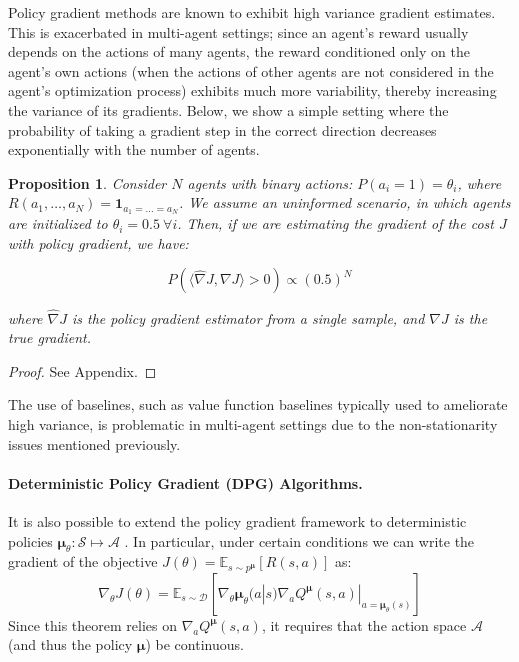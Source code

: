 \documentclass{article}
\newcommand{\cpol}[0]{\pmb{\mu}}
\newtheorem{prop}{Proposition}
\begin{document}
Policy gradient methods are known to exhibit high variance gradient estimates.  This is exacerbated in multi-agent settings; since an agent's reward usually depends on the actions of many agents, the reward conditioned only on the agent's own actions (when the actions of other agents are not considered in the agent's optimization process) exhibits much more variability, thereby increasing the variance of its gradients.
Below, we show a simple setting where the probability of taking a gradient step in the correct direction decreases exponentially with the number of agents. 
\begin{prop}\label{prop:pg}
Consider $N$ agents with binary actions: $P(a_i=1) = \theta_i$, where $R(a_1,\dots,a_N) = \mathbf{1}_{a_1=\dots=a_N}$. We assume an uninformed scenario, in which agents are initialized to $\theta_i=0.5 \ \forall i$. Then, if we are estimating the gradient of the cost $J$ with policy gradient, we have:

$$ P(\langle \hat{\nabla} J, \nabla J \rangle > 0) \propto (0.5)^N
$$

where $\hat{\nabla} J$ is the policy gradient estimator from a single sample, and $\nabla J$ is the true gradient.
\end{prop}

\begin{proof}
See Appendix.
\end{proof}
The use of baselines, such as value function baselines typically used to ameliorate high variance, is problematic in multi-agent settings due to the non-stationarity issues mentioned previously.


\paragraph{Deterministic Policy Gradient (DPG) Algorithms.} It is also possible to extend the policy gradient framework to deterministic policies $\cpol_\theta: \mathcal{S} \mapsto \mathcal{A}$ \cite{silver2014deterministic}. In particular, under certain conditions we can write the gradient of the objective $J(\theta) = \mathbb{E}_{s \sim p^{\cpol}}[R(s,a)]$ as:
\begin{equation}
\nabla_\theta J(\theta) = \mathbb{E}_{s \sim \mathcal{D}} [\nabla_\theta \cpol_\theta(a|s) \nabla_a Q^{\cpol} (s,a)|_{a=\cpol_\theta (s)}]
\end{equation}
Since this theorem relies on $\nabla_a Q^{\cpol} (s,a)$, it requires that the action space $\mathcal{A}$ (and thus the policy $\cpol$) be continuous. 
\end{document}
